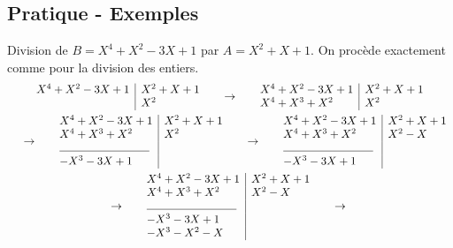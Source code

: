 \subsection{Pratique - Exemples}
Division de $B=X^4+X^2-3X+1$ par $A=X^2+X+1$. On procède exactement comme pour la division des entiers.
\renewcommand{\arraystretch}{1.9}
\begin{multline*}
 \begin{array}{l|l}
  X^4+X^2-3X+1 & X^2+X+1 \\
               & X^2
 \end{array} 
\hspace{0.5cm} \rightarrow \hspace{0.5cm}
 \begin{array}{l|l}
  X^4+X^2-3X+1   & X^2+X+1 \\
 X^4 + X^3 + X^2 & X^2
 \end{array} \\
\hspace{0.5cm} \rightarrow \hspace{0.5cm}
 \begin{array}{l|l}
  X^4+X^2-3X+1    & X^2+X+1 \\
  X^4 + X^3 + X^2 & X^2 \\
  \line(1,0){80} & \\
  -X^3-3X+1       &
 \end{array} 
\hspace{0.5cm} \rightarrow \hspace{0.5cm} 
 \begin{array}{l|l}
  X^4+X^2-3X+1    & X^2+X+1 \\
  X^4 + X^3 + X^2 & X^2 -X\\
  \line(1,0){80} & \\
  -X^3-3X+1       &
 \end{array} \\
 \hspace{0.5cm} \rightarrow \hspace{0.5cm} 
 \begin{array}{l|l}
  X^4+X^2-3X+1    & X^2+X+1 \\
  X^4 + X^3 + X^2 & X^2 -X\\
  \line(1,0){80} & \\
  -X^3-3X+1       & \\
  -X^3-X^2-X
 \end{array} 
 \hspace{0.5cm} \rightarrow \hspace{0.5cm} 
 \begin{array}{l|l}

\end{array}
\end{multline*}
